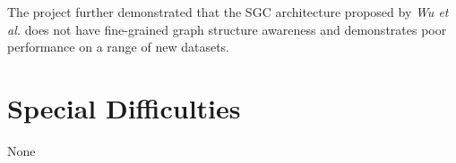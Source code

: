 \documentclass[12pt,a4paper,openany,openright]{report}
\begin{document}
The project further demonstrated that the SGC architecture proposed by \textit{Wu et al.} does not have fine-grained graph structure awareness and demonstrates poor performance on a range of new datasets.

\section*{Special Difficulties}

None


\pagestyle{headings}

\tableofcontents
\clearpage
{}









\appendix







\end{document}
